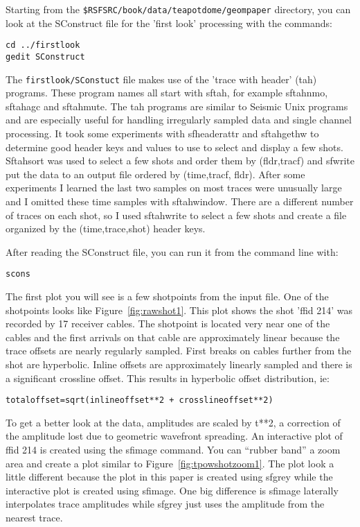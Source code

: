 Starting from the \texttt{\$RSFSRC/book/data/teapotdome/geompaper} directory, you can look at the SConstruct file for the 'first look' processing with the commands:
\begin{verbatim}
cd ../firstlook
gedit SConstruct
\end{verbatim}

The \texttt{firstlook/SConstuct} file makes use of the 'trace with header' (tah) programs.  These program names all start with sftah, for example sftahnmo, sftahagc and sftahmute.  The tah programs are similar to Seismic Unix programs and are especially useful for handling irregularly sampled data and single channel processing.   It took some experiments with sfheaderattr and sftahgethw to determine good header keys and values to use to select and display a few shots.  Sftahsort was used to select a few shots and order them by (fldr,tracf) and sfwrite put the data to an output file ordered by (time,tracf, fldr).  After some experiments I learned the last two samples on most traces were unusually large and I omitted these time samples with sftahwindow.   There are a different number of traces on each shot, so I used sftahwrite to select a few shots and create a file organized by the (time,trace,shot) header keys. 

After reading the SConstruct file, you can run it from the command line with:
\begin{verbatim}   
scons
\end{verbatim}   

The first plot you will see is a few shotpoints from the input file.  One of the shotpoints looks like Figure~\ref{fig:rawshot1}.  This plot shows the shot 'ffid 214' was recorded by 17 receiver cables.  The shotpoint is located very near one of the cables and the first arrivals on that cable are approximately linear because the trace offsets are nearly regularly sampled.  First breaks on cables further from the shot are hyperbolic.   Inline offsets are approximately linearly sampled and there is a significant crossline offset.  This results in hyperbolic offset distribution, ie:
\begin{verbatim}   
totaloffset=sqrt(inlineoffset**2 + crosslineoffset**2) 
\end{verbatim}   

To get a better look at the data, amplitudes are scaled by t**2, a correction of the amplitude lost due to geometric wavefront spreading.  An interactive plot of ffid 214 is created using the sfimage command.  You can “rubber band” a zoom area and create a plot similar to Figure~\ref{fig:tpowshotzoom1}.   The plot look a little different because the plot in this paper is created using sfgrey while the interactive plot is created using sfimage.  One big difference is sfimage laterally interpolates trace amplitudes while sfgrey just uses the amplitude from the nearest trace.

